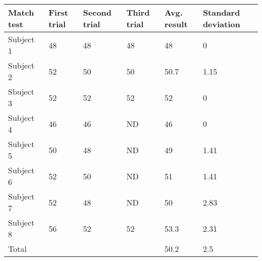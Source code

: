 \begin{table}[]
\begin{tabular}{l|lll|ll}
Match test & First trial & Second trial & Third trial & Avg. result & Standard deviation \\ \hline
Subject 1  & 48          & 48           & 48          & 48          & 0                  \\
Subject 2  & 52          & 50           & 50          & 50.7        & 1.15               \\
Sbuject 3  & 52          & 52           & 52          & 52          & 0                  \\
Subject 4  & 46          & 46           & ND          & 46          & 0                  \\
Subject 5  & 50          & 48           & ND          & 49          & 1.41               \\
Subject 6  & 52          & 50           & ND          & 51          & 1.41               \\
Subject 7  & 52          & 48           & ND          & 50          & 2.83               \\
Subject 8  & 56          & 52           & 52          & 53.3        & 2.31               \\ \hline
Total      &             &              &             & 50.2        & 2.5               
\end{tabular}
\end{table}